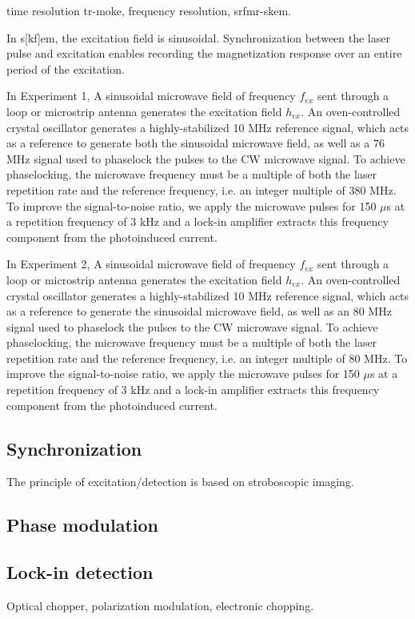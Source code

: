 \documentclass{article}
\begin{document}
time resolution tr-moke, frequency resolution, srfmr-skem.

In s[kf]em, the excitation field is sinusoidal. Synchronization between the laser pulse and excitation enables recording the magnetization response over an entire period of the excitation. 

In Experiment 1, A sinusoidal microwave field of frequency $f_{ex}$ sent through a loop or microstrip antenna generates the excitation field $h_{ex}$. An oven-controlled crystal oscillator generates a highly-stabilized 10 MHz reference signal, which acts as a reference to generate both the sinusoidal microwave field, as well as a 76 MHz signal used to phaselock the pulses to the CW microwave signal. To achieve phaselocking, the microwave frequency must be a multiple of both the laser repetition rate and the reference frequency, i.e. an integer multiple of 380 MHz. To improve the signal-to-noise ratio, we apply the microwave pulses for 150 $\mu$s at a repetition frequency of 3 kHz and a lock-in amplifier extracts this frequency component from the photoinduced current.

In Experiment 2, A sinusoidal microwave field of frequency $f_{ex}$ sent through a loop or microstrip antenna generates the excitation field $h_{ex}$. An oven-controlled crystal oscillator generates a highly-stabilized 10 MHz reference signal, which acts as a reference to generate the sinusoidal microwave field, as well as an 80 MHz signal used to phaselock the pulses to the CW microwave signal. To achieve phaselocking, the microwave frequency must be a multiple of both the laser repetition rate and the reference frequency, i.e. an integer multiple of 80 MHz. To improve the signal-to-noise ratio, we apply the microwave pulses for 150 $\mu$s at a repetition frequency of 3 kHz and a lock-in amplifier extracts this frequency component from the photoinduced current.

\subsection{Synchronization}
The principle of excitation/detection is based on stroboscopic imaging.

\subsection{Phase modulation}

\subsection{Lock-in detection}
Optical chopper, polarization modulation, electronic chopping.
\end{document}
